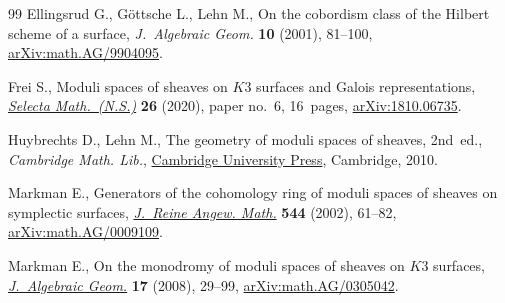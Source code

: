 \documentclass[11pt]{article}
\numberwithin{equation}{section}
\numberwithin{equation}{section}
\newcommand{\1}{\mathsf{1}}
\begin{document}
\begin{thebibliography}{99}
Ellingsrud G., G\"ottsche L., Lehn M., On the cobordism class of the {H}ilbert
  scheme of a surface, \textit{J.~Algebraic Geom.} \textbf{10} (2001), 81--100,
  \href{https://arxiv.org/abs/math.AG/9904095}{arXiv:math.AG/9904095}.

Frei S., Moduli spaces of sheaves on {$K3$} surfaces and {G}alois
  representations, \href{https://doi.org/10.1007/s00029-019-0530-7}{\textit{Selecta Math.~(N.S.)}} \textbf{26} (2020), paper no.~6, 16~pages, \href{https://arxiv.org/abs/1810.06735}{arXiv:1810.06735}.

Huybrechts D., Lehn M., The geometry of moduli spaces of sheaves, 2nd~ed.,
  \textit{Cambridge Math. Lib.}, \href{https://doi.org/10.1017/CBO9780511711985}{Cambridge University Press}, Cambridge, 2010.

Markman E., Generators of the cohomology ring of moduli spaces of sheaves on
  symplectic surfaces, \href{https://doi.org/10.1515/crll.2002.028}{\textit{J.~Reine Angew. Math.}} \textbf{544} (2002),
  61--82, \href{https://arxiv.org/abs/math.AG/0009109}{arXiv:math.AG/0009109}.

Markman E., On the monodromy of moduli spaces of sheaves on {$K3$} surfaces,
  \href{https://doi.org/10.1090/S1056-3911-07-00457-2}{\textit{J.~Algebraic Geom.}} \textbf{17} (2008), 29--99,
  \href{https://arxiv.org/abs/math.AG/0305042}{arXiv:math.AG/0305042}.

\end{thebibliography}
\end{document}
